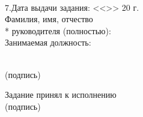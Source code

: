 \begin{titlepage}
\noindent \underline{\hspace{\textwidth}}
\noindent \underline{\hspace{\textwidth}}
\noindent \underline{\hspace{\textwidth}}
\noindent \underline{\hspace{\textwidth}}\\

\noindent 7.Дата выдачи задания: <<\underline{\hspace{1cm}}>>\underline{\hspace{3.5cm}} 20\underline{\hspace{0.8cm}} г.\\

\noindent Фамилия, имя, отчество\\*
руководителя (полностью):~\uline{\hfill}\\
\noindent Занимаемая должность:~\uline{\hfill}
\begin{flushright}
  \underline{\hspace{5cm}}\\
  \small
  (подпись)\hspace*{1.5cm}
  \normalsize
\end{flushright}


\noindent Задание принял к исполнению~\uline{\hfill}\\
\hspace*{11.5cm}
\small
(подпись)
\normalsize
\end{titlepage}
